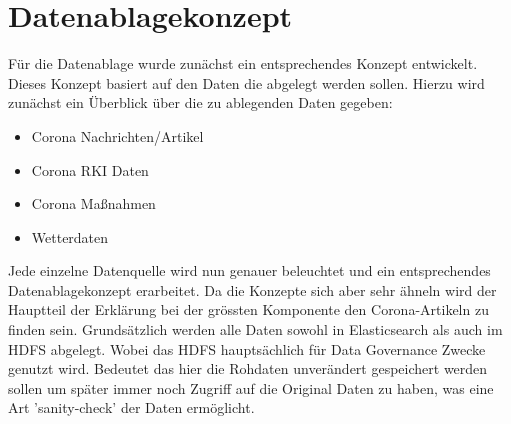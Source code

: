 \documentclass[12pt,oneside,a4paper,parskip]{scrbook}
\begin{document}
\chapter{Datenablagekonzept}
F\"ur die Datenablage wurde zun\"achst ein entsprechendes Konzept entwickelt. Dieses Konzept basiert auf den Daten die abgelegt werden sollen. Hierzu wird zun\"achst ein \"Uberblick \"uber die zu ablegenden Daten gegeben:
\begin{itemize}
	\item Corona Nachrichten/Artikel
	\item Corona RKI Daten
	\item Corona Maßnahmen
	\item Wetterdaten
\end{itemize}
Jede einzelne Datenquelle wird nun genauer beleuchtet und ein entsprechendes Datenablagekonzept erarbeitet. Da die Konzepte sich aber sehr \"ahneln wird der Hauptteil der Erkl\"arung bei der gr\"ossten Komponente den Corona-Artikeln zu finden sein. Grunds\"atzlich werden alle Daten sowohl in Elasticsearch als auch im HDFS abgelegt. Wobei das HDFS haupts\"achlich f\"ur Data Governance Zwecke genutzt wird. Bedeutet das hier die Rohdaten unver\"andert gespeichert werden sollen um sp\"ater immer noch Zugriff auf die Original Daten zu haben, was eine Art 'sanity-check' der Daten erm\"oglicht.
\end{document}
